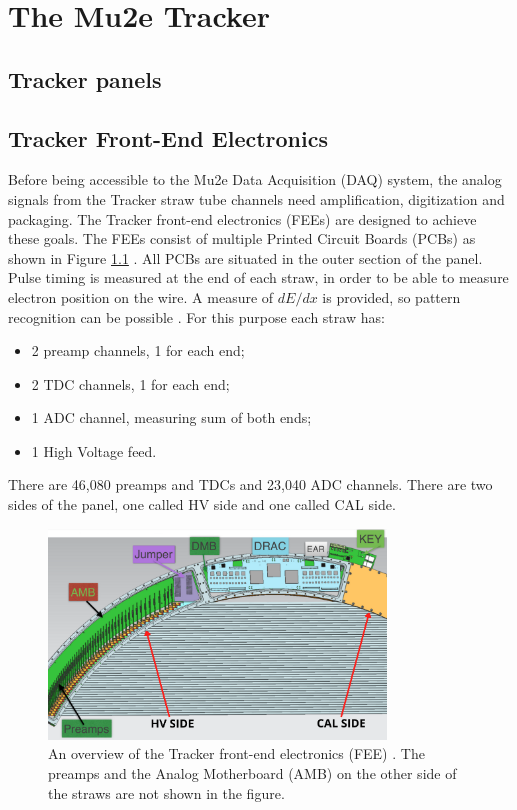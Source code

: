 \chapter{The Mu2e Tracker}\label{chaptertrk}
\section{Tracker panels}
\section{Tracker Front-End Electronics}
Before being accessible to the Mu2e Data Acquisition (DAQ) system, the analog signals from the Tracker straw tube channels need amplification, digitization and packaging. The Tracker front-end electronics (FEEs) are designed to achieve these goals. The FEEs consist of multiple Printed Circuit Boards (PCBs) as shown in Figure \ref{fig:trackerfee} \cite{vadimmu2e}.
All PCBs are situated in the outer section of the panel. Pulse timing is measured at the end of each straw, in order to be able to measure electron position on the wire. A measure of $dE/dx$ is provided, so pattern recognition can be possible \cite{bartoszek2015mu2e}. For this purpose each straw has:
\begin{itemize}
    \item 2 preamp channels, 1 for each end;
    \item 2 TDC channels, 1 for each end;
    \item 1 ADC channel, measuring sum of both ends;
    \item 1 High Voltage feed.
\end{itemize}
There are 46,080 preamps and TDCs and 23,040 ADC channels. There are two sides of the panel, one called HV side and one called CAL side. 
\begin{figure}[!h]
\centering
\includegraphics[width =0.8\textwidth]{images/chapter3/Screenshot_20240131_111836.png}
\caption{An overview of the Tracker front-end electronics (FEE) \cite{vadimmu2e}. The preamps and the Analog Motherboard (AMB) on the other side of the straws are not shown in the figure.}
\label{fig:trackerfee}
\end{figure}
